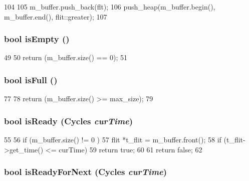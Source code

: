 \begin{DoxyCode}
104 {
105     m_buffer.push_back(flt);
106     push_heap(m_buffer.begin(), m_buffer.end(), flit::greater);
107 }
\end{DoxyCode}
\hypertarget{classflitBuffer_af337ffd75e4f019ce15302c60715d84b}{
\subsubsection[{isEmpty}]{\setlength{\rightskip}{0pt plus 5cm}bool isEmpty ()}}
\label{classflitBuffer_af337ffd75e4f019ce15302c60715d84b}



\begin{DoxyCode}
49 {
50     return (m_buffer.size() == 0);
51 }
\end{DoxyCode}
\hypertarget{classflitBuffer_a3e70330939fdfc4dbc2f60c1a660584d}{
\subsubsection[{isFull}]{\setlength{\rightskip}{0pt plus 5cm}bool isFull ()}}
\label{classflitBuffer_a3e70330939fdfc4dbc2f60c1a660584d}



\begin{DoxyCode}
77 {
78     return (m_buffer.size() >= max_size);
79 }
\end{DoxyCode}
\hypertarget{classflitBuffer_ae19b07af91a49435139ba13f5665b239}{
\subsubsection[{isReady}]{\setlength{\rightskip}{0pt plus 5cm}bool isReady ({\bf Cycles} {\em curTime})}}
\label{classflitBuffer_ae19b07af91a49435139ba13f5665b239}



\begin{DoxyCode}
55 {
56     if (m_buffer.size() != 0 ) {
57         flit *t_flit = m_buffer.front();
58         if (t_flit->get_time() <= curTime)
59             return true;
60     }
61     return false;
62 }
\end{DoxyCode}
\hypertarget{classflitBuffer_acfec01985f9a32bd6b7d9b86983962b3}{
\subsubsection[{isReadyForNext}]{\setlength{\rightskip}{0pt plus 5cm}bool isReadyForNext ({\bf Cycles} {\em curTime})}}
\label{classflitBuffer_acfec01985f9a32bd6b7d9b86983962b3}



